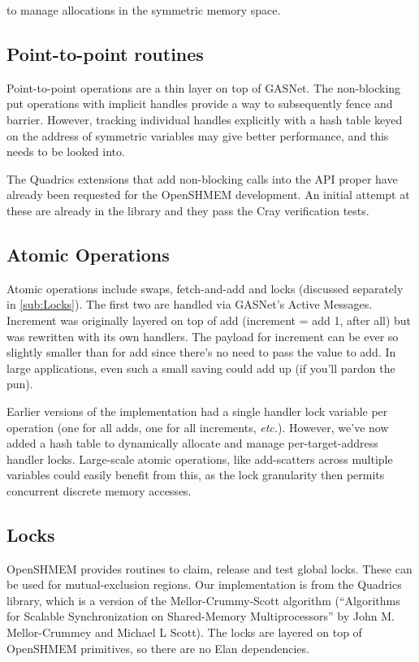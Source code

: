 \documentclass[english]{article}
\begin{document}
to manage allocations in the symmetric memory space.

\subsection{Point-to-point routines}

Point-to-point operations are a thin layer on top of GASNet. The
non-blocking put operations with implicit handles provide a way to
subsequently fence and barrier. However, tracking individual handles
explicitly with a hash table keyed on the address of symmetric
variables may give better performance, and this needs to be looked
into.

The Quadrics extensions that add non-blocking calls into the API
proper have already been requested for the OpenSHMEM development. An
initial attempt at these are already in the library and they pass the
Cray verification tests.

\subsection{Atomic Operations}

Atomic operations include swaps, fetch-and-add and locks (discussed
separately in \ref{sub:Locks}). The first two are handled via GASNet's
Active Messages. Increment was originally layered on top of add
(increment = add 1, after all) but was rewritten with its own
handlers. The payload for increment can be ever so slightly smaller
than for add since there's no need to pass the value to add. In large
applications, even such a small saving could add up (if you'll pardon
the pun).

Earlier versions of the implementation had a single handler lock
variable per operation (one for all adds, one for all increments,
\emph{etc.}).  However, we've now added a hash table to dynamically
allocate and manage per-target-address handler locks. Large-scale
atomic operations, like add-scatters across multiple variables could
easily benefit from this, as the lock granularity then permits
concurrent discrete memory accesses.

\subsection{\label{sub:Locks}Locks}

OpenSHMEM provides routines to claim, release and test global locks.
These can be used for mutual-exclusion regions. Our implementation is
from the Quadrics library, which is a version of the
Mellor-Crummy-Scott algorithm (``Algorithms for Scalable
Synchronization on Shared-Memory Multiprocessors'' by John
M. Mellor-Crummey and Michael L Scott).  The locks are layered on top
of OpenSHMEM primitives, so there are no Elan dependencies.
\end{document}
